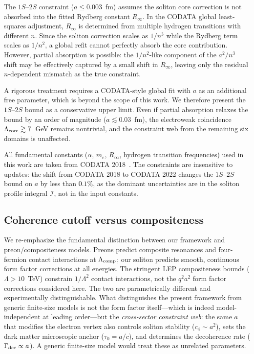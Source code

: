 ﻿\documentclass[a4paper,12pt]{article}
\begin{document}
The $1S$--$2S$ constraint ($a\leq 0.003$~fm) assumes the soliton
core correction is not absorbed into the fitted Rydberg constant
$R_\infty$.  In the CODATA global least-squares adjustment, $R_\infty$
is determined from multiple hydrogen transitions with different $n$.
Since the soliton correction scales as $1/n^3$ while the Rydberg
term scales as $1/n^2$, a global refit cannot perfectly absorb the
core contribution.  However, partial absorption is possible: the
$1/n^2$-like component of the $a^2/n^3$ shift may be effectively
captured by a small shift in $R_\infty$, leaving only the residual
$n$-dependent mismatch as the true constraint.

A rigorous treatment requires a CODATA-style global fit with $a$ as
an additional free parameter, which is beyond the scope of this work.
We therefore present the $1S$--$2S$ bound as a conservative upper
limit.  Even if partial absorption relaxes the bound by an order of
magnitude ($a\lesssim 0.03$~fm), the electroweak coincidence
$\Lambda_{\rm core}\gtrsim 7$~GeV remains nontrivial, and the
constraint web from the remaining six domains is unaffected.

All fundamental constants ($\alpha$, $m_e$, $R_\infty$, hydrogen transition frequencies) used in this work are taken from CODATA 2018~\cite{CODATA2018}.  The constraints are insensitive to updates: the shift from CODATA 2018 to CODATA 2022 changes the $1S$--$2S$ bound on $a$ by less than $0.1\%$, as the dominant uncertainties are in the soliton profile integral $\mathcal{I}$, not in the input constants.

\subsection{Coherence cutoff versus compositeness}

We re-emphasize the fundamental distinction between our framework and
preon/compositeness models.  Preons predict composite resonances and
four-fermion contact interactions at $\Lambda_{\rm comp}$; our soliton
predicts smooth, continuous form factor corrections at all energies.
The stringent LEP compositeness bounds ($\Lambda>10$~TeV) constrain
$1/\Lambda^2$ contact interactions, not the $q^2a^2$ form factor
corrections considered here.  The two are parametrically different and
experimentally distinguishable.
What distinguishes the present framework from generic finite-size
models is not the form factor itself---which is indeed
model-independent at leading order---but the \emph{cross-sector
constraint web}: the same $a$ that modifies the electron vertex
also controls soliton stability ($c_4\sim a^2$), sets the dark
matter microscopic anchor ($\tau_0=a/c$), and determines the
decoherence rate ($\Gamma_{\rm dec}\propto a$).  A generic
finite-size model would treat these as unrelated parameters.
\end{document}
